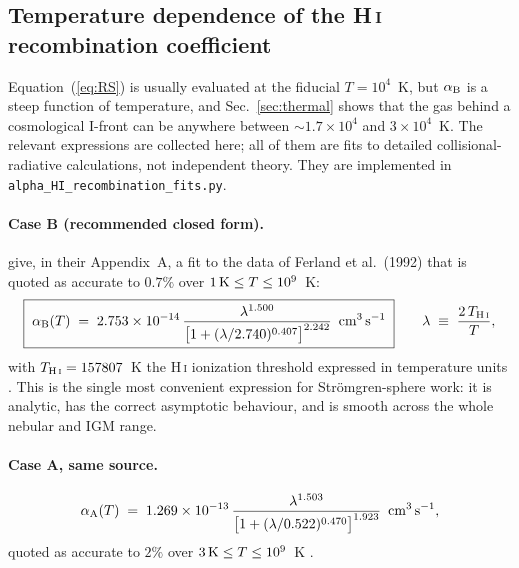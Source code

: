 \documentclass[11pt,a4paper]{article}
\newcommand{\aB}{\alpha_{\rm B}}
\newcommand{\aA}{\alpha_{\rm A}}
\newcommand{\cms}{\,{\rm cm^{3}\,s^{-1}}}
\begin{document}
\subsection{Temperature dependence of the H\,\textsc{i} recombination coefficient}
\label{sec:alphaT}
Equation~(\ref{eq:RS}) is usually evaluated at the fiducial $T=10^4$~K, but $\aB$ is a steep
function of temperature, and Sec.~\ref{sec:thermal} shows that the gas behind a cosmological I-front
can be anywhere between $\sim1.7\times10^4$ and $3\times10^4$~K. The relevant expressions are
collected here; all of them are fits to detailed collisional-radiative calculations, not independent
theory. They are implemented in \texttt{alpha\_HI\_recombination\_fits.py}.

\paragraph{Case B (recommended closed form).}
\citet{Hui1997} give, in their Appendix~A, a fit to the data of Ferland et al.\ (1992) that is
quoted as accurate to $0.7\%$ over $1\,{\rm K}\le T\le10^9$~K:
\begin{equation}
  \boxed{\;
  \aB(T) \;=\; 2.753\times10^{-14}\,
  \frac{\lambda^{1.500}}{\bigl[1+(\lambda/2.740)^{0.407}\bigr]^{2.242}}\ \cms\;}
  \qquad
  \lambda \;\equiv\; \frac{2\,T_{\rm H\,\textsc{i}}}{T},
  \label{eq:aB_hui}
\end{equation}
with $T_{\rm H\,\textsc{i}}=157807$~K the H\,\textsc{i} ionization threshold expressed in
temperature units \citep{Hui1997}. This is the single most convenient expression for
Str\"omgren-sphere work: it is analytic, has the correct asymptotic behaviour, and is smooth across
the whole nebular and IGM range.

\paragraph{Case A, same source.}
\begin{equation}
  \aA(T) \;=\; 1.269\times10^{-13}\,
  \frac{\lambda^{1.503}}{\bigl[1+(\lambda/0.522)^{0.470}\bigr]^{1.923}}\ \cms,
  \label{eq:aA_hui}
\end{equation}
quoted as accurate to $2\%$ over $3\,{\rm K}\le T\le10^9$~K \citep{Hui1997}.
\end{document}
